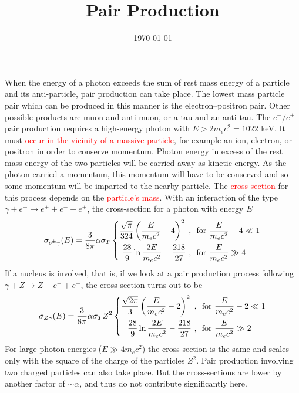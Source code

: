 \documentclass[12pt,a4paper]{article}
\title{Pair Production}
\author{}
\date{\today}
\begin{document}
\maketitle

\cite{2012agn..book.....B} When the energy of a photon exceeds the sum of rest mass energy of a particle and its anti-particle, pair production can take place. The lowest mass particle pair which can be produced in this manner is the electron–positron pair. Other possible products are muon and anti-muon, or a tau and an anti-tau. The $e^-/e^+$ pair production requires a high-energy photon with $E > 2m_e c^2 = 1022$ keV. It must \textcolor{red}{occur in the vicinity of a massive particle}, for example an ion, electron, or positron in order to conserve momentum. Photon energy in excess of the rest mass energy of the two particles will be carried away as kinetic energy. As the photon carried a momentum, this momentum will have to be conserved and so some momentum will be imparted to the nearby particle. The \textcolor{red}{cross-section} for this process depends on the \textcolor{red}{particle's mass}. With an interaction of the type $\gamma + e^{\pm} \rightarrow e^{\pm} +e^- +e^+$, the cross-section for a photon with energy $E$
\begin{align}
\sigma_{e^\pm \gamma}(E) = \dfrac{3}{8\pi} \alpha \sigma_T 
\left\{
\begin{aligned}
\dfrac{\sqrt{\pi}}{324} \left(\dfrac{E}{m_e c^2} -4 \right)^2 ~, ~& ~ {\rm for}~ \dfrac{E}{m_e c^2} -4 \ll 1 \\
\dfrac{28}{9} \ln \dfrac{2E}{m_e c^2} -\dfrac{218}{27} ~, ~& ~{\rm for}~ \dfrac{E}{m_e c^2} \gg 4 
\end{aligned}
\right.
\end{align}
If a nucleus is involved, that is, if we look at a pair production process following $\gamma + Z \rightarrow Z +e^- +e^+$, the cross-section turns out to be
\begin{align}
\sigma_{Z \gamma}(E) = \dfrac{3}{8\pi} \alpha \sigma_T Z^2
\left\{
\begin{aligned}
\dfrac{\sqrt{2 \pi}}{3} \left(\dfrac{E}{m_e c^2} -2 \right)^2 ~, ~& ~ {\rm for}~ \dfrac{E}{m_e c^2} -2 \ll 1 \\
\dfrac{28}{9} \ln \dfrac{2E}{m_e c^2} -\dfrac{218}{27} ~, ~& ~{\rm for}~ \dfrac{E}{m_e c^2} \gg 2 
\end{aligned}
\right.
\end{align}
For large photon energies ($E \gg 4m_e c^2$) the cross-section is the same and scales only with the square of the charge of the particles $Z^2$. Pair production involving two charged particles can also take place. But the cross-sections are lower by another factor of $\sim \alpha$, and thus do not contribute significantly here.
\end{document}
